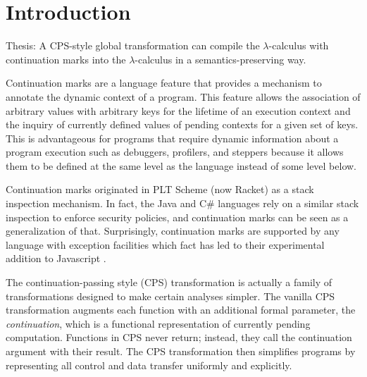 \documentclass[ms]{byuprop}
\title{\Title}
\author{\Author}
\begin{document}
\maketitle



\section{Introduction}


Thesis: A CPS-style global transformation can compile the $\lambda$-calculus with
continuation marks into the $\lambda$-calculus in a semantics-preserving
way.




Continuation marks \cite{clements2006portable} are a language feature that provides a
mechanism to annotate the dynamic context of a program. This feature allows the
association of arbitrary values with arbitrary keys for the lifetime of an execution
context and the inquiry of currently defined values of pending contexts for a given set of
keys. This is advantageous for programs that require dynamic information about a program
execution such as debuggers, profilers, and steppers because it allows them to be defined
at the same level as the language instead of some level below.

Continuation marks originated in PLT Scheme (now Racket) \cite{plt-tr1} as a stack 
inspection mechanism. In fact, the Java and C\# languages rely on a similar stack 
inspection to enforce security policies, and continuation marks can be seen as a 
generalization of that. Surprisingly, continuation marks are supported by any language 
with exception facilities \cite{pettyjohn2005continuations} which fact has led to their 
experimental addition to Javascript \cite{clements2008implementing}.

The continuation-passing style (CPS) transformation is actually a family of 
transformations designed to make certain analyses simpler. The vanilla CPS transformation 
augments each function with an additional formal parameter, the \emph{continuation}, which 
is a functional representation of currently pending computation. Functions in CPS never 
return; instead, they call the continuation argument with their result. The CPS 
transformation then simplifies programs by representing all control and data transfer 
uniformly and explicitly.
\end{document}
